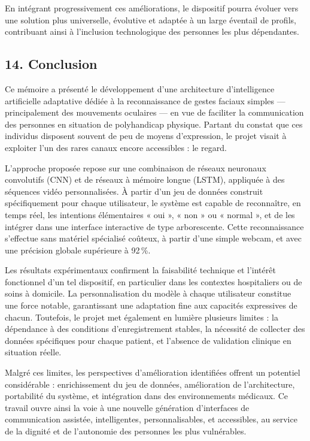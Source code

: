 \documentclass[
]{article}
\begin{document}
En intégrant progressivement ces améliorations, le dispositif pourra évoluer vers une solution plus universelle, évolutive et adaptée à un large éventail de profils, contribuant ainsi à l'inclusion technologique des personnes les plus dépendantes.

\hypertarget{conclusion}{%
\subsection{14. Conclusion}\label{conclusion}}

Ce mémoire a présenté le développement d'une architecture d'intelligence artificielle adaptative dédiée à la reconnaissance de gestes faciaux simples --- principalement des mouvements oculaires --- en vue de faciliter la communication des personnes en situation de polyhandicap physique. Partant du constat que ces individus disposent souvent de peu de moyens d'expression, le projet visait à exploiter l'un des rares canaux encore accessibles : le regard.

L'approche proposée repose sur une combinaison de réseaux neuronaux convolutifs (CNN) et de réseaux à mémoire longue (LSTM), appliquée à des séquences vidéo personnalisées. À partir d'un jeu de données construit spécifiquement pour chaque utilisateur, le système est capable de reconnaître, en temps réel, les intentions élémentaires « oui », « non » ou « normal », et de les intégrer dans une interface interactive de type arborescente. Cette reconnaissance s'effectue sans matériel spécialisé coûteux, à partir d'une simple webcam, et avec une précision globale supérieure à 92\,\%.

Les résultats expérimentaux confirment la faisabilité technique et l'intérêt fonctionnel d'un tel dispositif, en particulier dans les contextes hospitaliers ou de soins à domicile. La personnalisation du modèle à chaque utilisateur constitue une force notable, garantissant une adaptation fine aux capacités expressives de chacun. Toutefois, le projet met également en lumière plusieurs limites : la dépendance à des conditions d'enregistrement stables, la nécessité de collecter des données spécifiques pour chaque patient, et l'absence de validation clinique en situation réelle.

Malgré ces limites, les perspectives d'amélioration identifiées offrent un potentiel considérable : enrichissement du jeu de données, amélioration de l'architecture, portabilité du système, et intégration dans des environnements médicaux. Ce travail ouvre ainsi la voie à une nouvelle génération d'interfaces de communication assistée, intelligentes, personnalisables, et accessibles, au service de la dignité et de l'autonomie des personnes les plus vulnérables.
\end{document}
